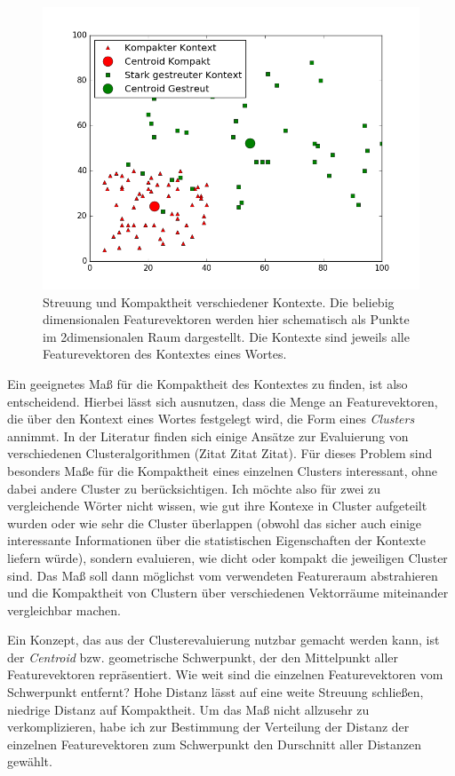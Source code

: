 \documentclass[11pt,numbers=noenddot]{scrartcl}
\begin{document}
\begin{figure}
    \includegraphics[width = \textwidth]{kontext}
    \caption{Streuung und Kompaktheit verschiedener Kontexte. Die beliebig dimensionalen Featurevektoren werden hier schematisch als Punkte im 2dimensionalen Raum dargestellt. Die Kontexte sind jeweils alle Featurevektoren des Kontextes eines Wortes.}
    \label{kontext}
\end{figure}

Ein geeignetes Maß für die Kompaktheit des Kontextes zu finden, ist also entscheidend. Hierbei lässt sich ausnutzen, dass die Menge an Featurevektoren, die über den Kontext eines Wortes festgelegt wird, die Form eines \emph{Clusters} annimmt. In der Literatur finden sich einige Ansätze zur Evaluierung von verschiedenen Clusteralgorithmen (Zitat Zitat Zitat). Für dieses Problem sind besonders Maße für die Kompaktheit eines einzelnen Clusters interessant, ohne dabei andere Cluster zu berücksichtigen. Ich möchte also für zwei zu vergleichende Wörter nicht wissen, wie gut ihre Kontexe in Cluster aufgeteilt wurden oder wie sehr die Cluster überlappen (obwohl das sicher auch einige interessante Informationen über die statistischen Eigenschaften der Kontexte liefern würde), sondern evaluieren, wie dicht oder kompakt die jeweiligen Cluster sind. Das Maß soll dann möglichst vom verwendeten Featureraum abstrahieren und die Kompaktheit von Clustern über verschiedenen Vektorräume miteinander vergleichbar machen.

Ein Konzept, das aus der Clusterevaluierung nutzbar gemacht werden kann, ist der \emph{Centroid} bzw. geometrische Schwerpunkt, der den Mittelpunkt aller Featurevektoren repräsentiert. Wie weit sind die einzelnen Featurevektoren vom Schwerpunkt entfernt? Hohe Distanz lässt auf eine weite Streuung schließen, niedrige Distanz auf Kompaktheit. Um das Maß nicht allzusehr zu verkomplizieren, habe ich zur Bestimmung der Verteilung der Distanz der einzelnen Featurevektoren zum Schwerpunkt den Durschnitt aller Distanzen gewählt.
\end{document}
